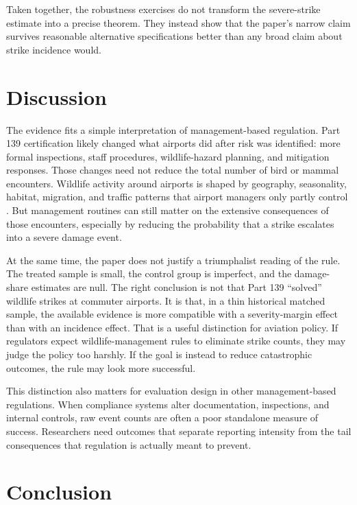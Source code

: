 \documentclass[12pt]{article}
\begin{document}
Taken together, the robustness exercises do not transform the severe-strike estimate into a precise theorem. They instead show that the paper's narrow claim survives reasonable alternative specifications better than any broad claim about strike incidence would.

\section{Discussion}

The evidence fits a simple interpretation of management-based regulation. Part 139 certification likely changed what airports did after risk was identified: more formal inspections, staff procedures, wildlife-hazard planning, and mitigation responses. Those changes need not reduce the total number of bird or mammal encounters. Wildlife activity around airports is shaped by geography, seasonality, habitat, migration, and traffic patterns that airport managers only partly control \citep{Burger_1985,Washburn_2013}. But management routines can still matter on the extensive consequences of those encounters, especially by reducing the probability that a strike escalates into a severe damage event.

At the same time, the paper does not justify a triumphalist reading of the rule. The treated sample is small, the control group is imperfect, and the damage-share estimates are null. The right conclusion is not that Part 139 ``solved'' wildlife strikes at commuter airports. It is that, in a thin historical matched sample, the available evidence is more compatible with a severity-margin effect than with an incidence effect. That is a useful distinction for aviation policy. If regulators expect wildlife-management rules to eliminate strike counts, they may judge the policy too harshly. If the goal is instead to reduce catastrophic outcomes, the rule may look more successful.

This distinction also matters for evaluation design in other management-based regulations. When compliance systems alter documentation, inspections, and internal controls, raw event counts are often a poor standalone measure of success. Researchers need outcomes that separate reporting intensity from the tail consequences that regulation is actually meant to prevent.

\section{Conclusion}
\end{document}
